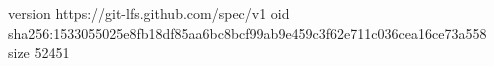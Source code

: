 version https://git-lfs.github.com/spec/v1
oid sha256:1533055025e8fb18df85aa6bc8bcf99ab9e459c3f62e711c036cea16ce73a558
size 52451
